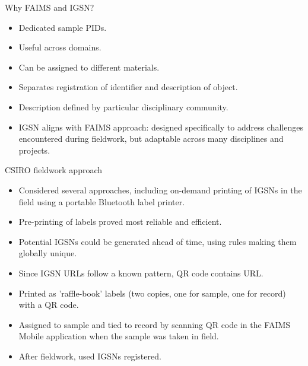 \begin{frame}{Why FAIMS and IGSN?}
    \begin{itemize}
        \item Dedicated sample PIDs.
        \item Useful across domains.
        \item Can be assigned to different materials.
        \item Separates registration of identifier and description of object.
        \item Description defined by particular disciplinary community.
        \item IGSN aligns with FAIMS approach: designed specifically to address challenges encountered during fieldwork, but adaptable across many disciplines and projects.
    \end{itemize}
\end{frame}

\begin{frame}{CSIRO fieldwork approach}
    \begin{itemize}
        \item Considered several approaches, including on-demand printing of IGSNs in the field using a portable Bluetooth label printer.
        \item Pre-printing of labels proved most reliable and efficient.
        \item Potential IGSNs could be generated ahead of time, using rules making them globally unique.
        \item Since IGSN URLs follow a known pattern, QR code contains URL.
        \item Printed as 'raffle-book' labels (two copies, one for sample, one for record) with a QR code.
        \item Assigned to sample and tied to record by scanning QR code in the FAIMS Mobile application when the sample was taken in field.
        \item After fieldwork, used IGSNs registered.
    \end{itemize}
\end{frame}




